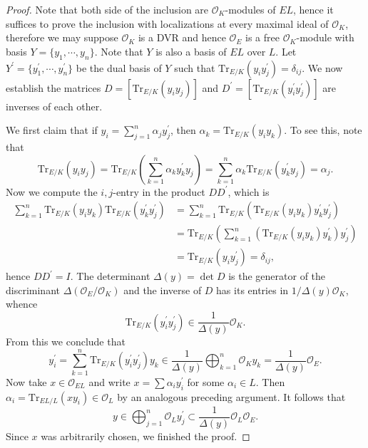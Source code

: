 \begin{proof}
Note that both side of the inclusion are $\mathcal{O}_K$-modules of $EL$, hence it suffices to prove the inclusion with localizations at every maximal ideal of $\mathcal{O}_K$, therefore we may suppose $\mathcal{O}_K$ is a DVR and hence $\mathcal{O}_E$ is a free $\mathcal{O}_K$-module with basis $Y=\{y_1,\cdots,y_n\}$. Note that $Y$ is also a basis of $EL$ over $L$. Let $Y^\prime=\{y_1^\prime,\cdots,y_n^\prime\}$ be the dual basis of $Y$ such that $\mathrm{Tr}_{E/K}(y_iy_j^\prime)=\delta_{ij}$. We now establish the matrices $D=[\mathrm{Tr}_{E/K}(y_iy_j)]$ and $D^\prime=[\mathrm{Tr}_{E/K}(y_i^\prime y_j^\prime)]$ are inverses of each other.\par
We first claim that if $y_i=\sum_{j=1}^n\alpha_jy_j^\prime$, then $\alpha_k=\mathrm{Tr}_{E/K}(y_iy_k)$. To see this, note that 
$$
\mathrm{Tr}_{E/K}\left( y_iy_j \right) =\mathrm{Tr}_{E/K}\left( \sum_{k=1}^n{\alpha _ky_{k}^{\prime}y_j} \right) =\sum_{k=1}^n{\alpha _k\mathrm{Tr}_{E/K}\left( y_{k}^{\prime}y_j \right)}=\alpha _j.
$$
Now we compute the $i,j$-entry in the product $DD^\prime$, which is 
$$
\begin{aligned}
\sum_{k=1}^n{\mathrm{Tr}_{E/K}\left( y_iy_k \right) \mathrm{Tr}_{E/K}\left( y_{k}^{\prime}y_{j}^{\prime} \right)}&=\sum_{k=1}^n{\mathrm{Tr}_{E/K}\left( \mathrm{Tr}_{E/K}\left( y_iy_k \right) y_{k}^{\prime}y_{j}^{\prime} \right)}
\\
&=\mathrm{Tr}_{E/K}\left( \sum_{k=1}^n{\left( \mathrm{Tr}_{E/K}\left( y_iy_k \right) y_{k}^{\prime} \right)}y_{j}^{\prime} \right)
\\
&=\mathrm{Tr}_{E/K}\left( y_iy_{j}^{\prime} \right) =\delta _{ij},
\end{aligned}
$$
hence $DD^\prime=I$. The determinant $\Delta(y)=\det D$ is the generator of the discriminant $\Delta(\mathcal{O}_E/\mathcal{O}_K)$ and the inverse of $D$ has its entries in $1/\Delta(y)\mathcal{O}_K$, whence 
$$
\mathrm{Tr}_{E/K}\left( y_{i}^{\prime}y_{j}^{\prime} \right) \in \frac{1}{\Delta \left( y \right)}\mathcal{O} _K.
$$
From this we conclude that 
$$
y_{i}^{\prime}=\sum_{k=1}^n{\mathrm{Tr}_{E/K}\left( y_{i}^{\prime}y_{j}^{\prime} \right) y_k}\in \frac{1}{\Delta \left( y \right)}\bigoplus_{k=1}^n{\mathcal{O} _Ky_k}=\frac{1}{\Delta \left( y \right)}\mathcal{O} _E.
$$
Now take $x\in\mathcal{O}_{EL}$ and write $x=\sum\alpha_iy_i^\prime$ for some $\alpha_i\in L$. Then $\alpha_i=\mathrm{Tr}_{EL/L}(xy_i)\in\mathcal{O}_L$ by an analogous preceding argument. It follows that 
$$
y\in \bigoplus_{j=1}^n{\mathcal{O} _Ly_{j}^{\prime}}\subset \frac{1}{\Delta \left( y \right)}\mathcal{O} _L\mathcal{O} _E.
$$
Since $x$ was arbitrarily chosen, we finished the proof.
\end{proof}
